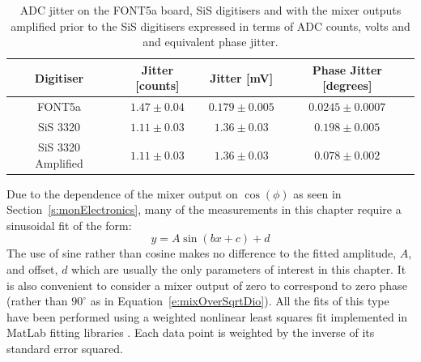 \begin{table}
  \begin{center}
    \begin{tabular}{|c c c c|}
	   \hline
       Digitiser & Jitter [counts] & Jitter [mV] & Phase Jitter [degrees] \\ \hline
       FONT5a & \(1.47\pm0.04\) & \(0.179\pm0.005\) & \(0.0245\pm0.0007\)\\ 
       SiS 3320 & \(1.11\pm0.03\) & \(1.36\pm0.03\) & \(0.198\pm0.005\)\\
       SiS 3320 Amplified & \(1.11\pm0.03\) & \(1.36\pm0.03\) & \(0.078\pm0.002\)\\ \hline
    \end{tabular}
    \caption{ADC jitter on the FONT5a board, SiS digitisers and with the mixer outputs amplified prior to the SiS digitisers expressed in terms of ADC counts, volts and and equivalent phase jitter.}
  	\label{t:adcNoise}
  \end{center}
\end{table}




Due to the dependence of the mixer output on \(\cos(\phi)\) as seen in Section~\ref{s:monElectronics}, many of the measurements in this chapter require a sinusoidal fit of the form:
\begin{equation}
y = A\sin(bx + c) + d
\label{e:generalSinEq}
\end{equation}
The use of sine rather than cosine makes no difference to the fitted amplitude, \(A\), and offset, \(d\) which are usually the only parameters of interest in this chapter. It is also convenient to consider a mixer output of zero to correspond to zero phase (rather than \(90^\circ\) as in Equation~\ref{e:mixOverSqrtDio}). All the fits of this type have been performed using a weighted nonlinear least squares fit implemented in MatLab fitting libraries \cite{MatLabFit}. Each data point is weighted by the inverse of its standard error squared.

